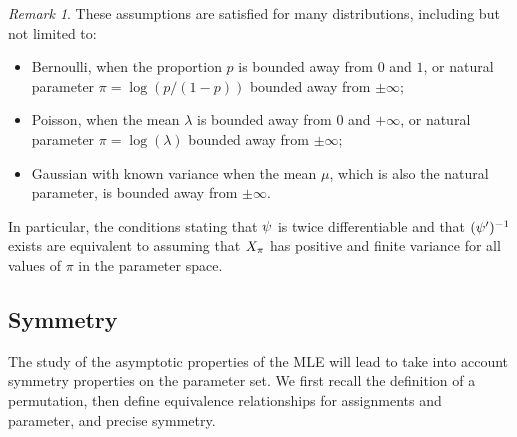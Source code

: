 \documentclass[]{imsart}
\newcommand{\1}{\mathds{1}}
\numberwithin{equation}{section}
\theoremstyle{plain}
\theoremstyle{remark}
\newtheorem{rem}[thm]{Remark}
\begin{document}
\begin{rem}
These assumptions are satisfied for many distributions, including but not limited to:
\begin{itemize}
\item Bernoulli, when the proportion $p$ is bounded away from $0$ and $1$, or natural parameter $\pi = \log(p / (1 - p))$ bounded away from $\pm \infty$;
\item Poisson, when the mean $\lambda$ is bounded away from $0$ and $+\infty$, or natural parameter $\pi = \log(\lambda)$ bounded away from $\pm \infty$;
\item Gaussian with known variance when the mean $\mu$, which is also the natural parameter, is bounded away from $\pm \infty$.
\end{itemize}
In particular, the conditions stating that $\psi$ is twice differentiable and that $(\psi')^{-1}$ exists are equivalent to assuming that $X_{\pi}$ has positive and finite variance for all values of $\pi$ in the parameter space.
\end{rem}







\subsection{Symmetry}
\label{sec:definitions}
The study of the asymptotic properties of the MLE will lead to take into account symmetry properties on the parameter set. We first recall the definition of a permutation, then define equivalence relationships for assignments and parameter, and  precise symmetry. 
\end{document}
